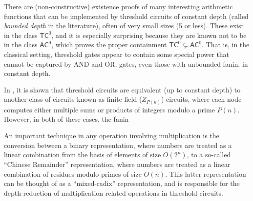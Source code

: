 There are (non-constructive) existence proofs of many interesting 
arithmetic functions that can be implemented by threshold circuits
of constant depth (called \emph{bounded depth} in the literature),
often of very small sizes (5 or less). These exist in the class
$\textsf{TC}^0$, and it is especially surprising because they are known
not to be in the class $\textsf{AC}^0$, which proves the proper
containment $\textsf{TC}^0 \subsetneq \textsf{AC}^0$. That is, in
the classical setting, threshold gates appear to contain some
special power that cannot be captured by AND and OR, gates, even those
with unbounded fanin, in constant depth.

In \cite{Reif1992}, it is shown that threshold circuits
are equivalent (up to constant depth) to another class of
circuits known as finite field ($Z_{P(n)}$) circuits, where each node
computes either multiple sums or products of integers modulo a
prime $P(n)$. However, in both of these cases, the fanin

An important technique in any operation involving multiplication is
the conversion between a binary representation, where numbers are
treated as a linear combination from the basis of elements of
size $O(2^n)$, to a so-called ``Chinese Remainder'' representation,
where numbers are treated as a linear combination of residues
modulo primes of size $O(n)$. This latter representation can be thought
of as a ``mixed-radix'' representation, and is responsible for
the depth-reduction of multiplication related operations in
threshold circuits.